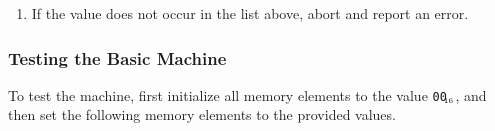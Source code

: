 \documentclass[a4paper,12pt]{article}
\newcommand{\num}[1]{\texttt{#1}\xspace}
\newcommand{\hex}[1]{\num{#1}$_{\textup{\tiny\hskip-1ex 16}}$\xspace}
\newcommand{\PC}{\textbf{program counter}\xspace}
\begin{document}
\begin{enumerate}
\begin{itemize}
\begin{enumerate}
    \item Set the 64-bit value of $i$ to 0.
    \item Do the following 8 times:
      \begin{enumerate}
      \item Set the value of byte $i$ of $a$ to the value of memory element \PC.
      \item Increment \PC by 1.
      \end{enumerate}
    \item Push the 64-bit value $a$.
    \end{enumerate}
  \end{itemize}
\item If the value does not occur in the list above, abort and report an error.
\end{enumerate}

\subsubsection{Testing the Basic Machine}

To test the machine, first initialize all memory elements to the value \hex{00}, and then set the following memory elements to the provided values.
\end{document}
